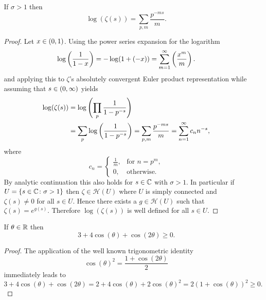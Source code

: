 \begin{lemma}\label{lem:LogEulerProd}
	If $\sigma > 1$ then
\begin{equation*}
	\log(\zeta(s)) = \sum _{p,m} \frac{p^{-ms}}{m}.
\end{equation*}
\end{lemma}
\begin{proof}
	Let $x \in \left(0, 1\right)$. Using the power series expansion for the logarithm
\begin{equation*}
	\log\left(\frac{1}{1 - x}\right) = -\log(1 + (-x)) = \sum _{m = 1} ^\infty \left(\frac{x^m}{m}\right).
\end{equation*}
	and applying this to $\zeta$'s absolutely convergent Euler product representation while assuming that $s \in \left(0 , \infty\right)$ yields
\begin{equation*}
\begin{aligned}	
	\log(\zeta(s)) 
		&= \log\left(\prod _p \frac{1}{1 - p^{-s}}\right) \\
		&= \sum _p \log\left(\frac{1}{1 - p^{-s}}\right)
		= \sum _{p,m} \frac{p^{-ms}}{m} = \sum _{n=1} ^{\infty} c_n n^{-s},
\end{aligned}
\end{equation*}
	where
\begin{equation*}
    c_n =
    \left\{
    	\begin{array}{ll}
        	\frac{1}{m}, & \text{for } n = p^m, \\
        	0, & \text{otherwise.}
        \end{array}
	\right.
\end{equation*}
	By analytic continuation this also holds for $s \in \mathbb{C}$ with $\sigma > 1$. In particular if $U = \left\{s \in \mathbb{C} \colon \sigma > 1\right\}$ then $\zeta \in \mathcal{H}(U)$ where $U$ is simply connected and $\zeta(s) \neq 0$ for all $s \in U$. Hence there exists a $g \in \mathcal{H}(U)$ such that $\zeta(s) = e^{g(s)}$. Therefore $\log(\zeta(s))$ is well defined for all $s \in U$.
\end{proof}


\begin{lemma}\label{lem:CosAddTh}
	If $\theta \in \mathbb{R}$ then
\begin{equation*}
	3 + 4 \cos(\theta) + \cos(2 \theta) \geq 0.
\end{equation*}
\end{lemma}
\begin{proof}
	The application of the well known trigonometric identity
\begin{equation*}
	\cos(\theta)^2 = \frac{1 + \cos(2 \theta)}{2}
\end{equation*}
	immediately leads to
\begin{equation*}
	3 + 4 \cos(\theta) + \cos(2 \theta) = 2 + 4 \cos(\theta) + 2 \cos(\theta)^2 = 2(1 + \cos(\theta))^2 \geq 0.
\end{equation*}
\end{proof}


